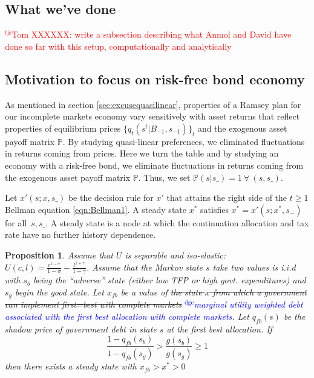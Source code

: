 \documentclass[12pt]{article}
\newcommand{\dge}[1]{\textcolor{blue}{$^{\textrm{dge}}${#1}}}
\newcommand{\tjs}[1]{\textcolor{red}{$^{\textrm{tjs}}${#1}}}
\newtheorem{proposition}[theorem]{Proposition}
\begin{document}
\subsection{What we've done}

\tjs{Tom XXXXXX: write a subsection describing what Anmol and David have done so far with this setup, computationally
and analytically}

\subsection{Motivation to focus on risk-free bond economy\label{sec:riskfreeonly}}

As mentioned in section \ref{sec:excusequasilinear},  properties of a Ramsey plan for our incomplete markets economy vary sensitively  with   asset returns that reflect
	properties of equilibrium prices $\{q_t(s^t|B_{-1},s_{-1})\}_t$ and the exogenous asset payoff matrix $\mathbb{P}$.  By studying
quasi-linear preferences, we eliminated fluctuations in returns coming from prices.  Here we turn the table and by studying an economy
with a risk-free bond, we eliminate fluctuations in returns coming from the exogenous asset payoff matrix $\mathbb{P}$.
Thus, we set $\mathbb{P}(s|s\_)=1 \ \forall \ (s,s\_)$.  



Let $x'\left( s;{x},s\_\right) $ be the decision rule for $x'$ that attains the right side of the $t\geq1$ Bellman equation
\eqref{eqn:Bellman1}.  A steady state  ${x}^{*} $  satisfies ${ x}^{*}  =x' \left( s;{x}^{*},s_{-}\right) $ for all $%
\,s,s\_$. 
A steady state is a node at which the  continuation allocation and tax rate have no further history dependence. 

\begin{proposition}\label{prop:existenceU}  
Assume that $U$ is  separable and iso-elastic:	 $U(c,l) = \frac{c^{1-\sigma}}{1-\sigma} -\frac{ l^{1+\gamma}}{1+\gamma}$.
Assume that 
	 the Markov state $s$ take two values is  i.i.d with $s_b$  being the ``adverse'' state (either low TFP or high govt. expenditures)
and $s_g$ begin the good state.
		Let $x_{fb}$ be a value of \st{the state $x$ from which a government can implement first=best with complete markets} \dge{marginal utility weighted debt associated with the first best allocation with complete markets}.
	 Let $q_{fb}(s)$ be the shadow price of government debt in state $s$ at the first best allocation.
	If
	\begin{equation}\label{eqn:prop52sufficient}
		\frac{1-q_{fb}(s_b)}{1-q_{fb}(s_g)} > \frac{g(s_b)}{g(s_g)}\geq 1
	\end{equation}
		then there exists a steady state with $x_{fb}>x^*>0$
		\end{proposition}
\end{document}
